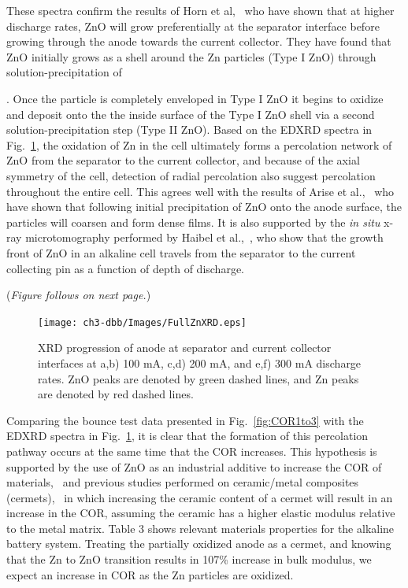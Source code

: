 {These spectra confirm the results of Horn et al,~\cite{horn} who have shown that at higher discharge rates, ZnO will grow preferentially at the separator interface before growing through the anode towards the current collector. They have found that ZnO initially grows as a shell around the Zn particles (Type I ZnO) through solution-precipitation of {. Once the particle is completely enveloped in Type I ZnO it begins to oxidize and deposit onto the the inside surface of the Type I ZnO shell via a second solution-precipitation step (Type II ZnO). Based on the EDXRD spectra in Fig.~\ref{fig:znxrd}, the oxidation of Zn in the cell ultimately forms a percolation network of ZnO from the separator to the current collector, and because of the axial symmetry of the cell, detection of radial percolation also suggest percolation throughout the entire cell. This agrees well with the results of Arise et al.,~\cite{arise} who have shown that following initial precipitation of ZnO onto the anode surface, the particles will coarsen and form dense films. It is also supported by the \textit{in situ} x-ray microtomography performed by Haibel et al.,~\cite{haibel}, who show that the growth front of ZnO in an alkaline cell travels from the separator to the current collecting pin as a function of depth of discharge.
\begin{minipage}{\textwidth}
\centering
(\textit{Figure follows on next page.})
\end{minipage}
\clearpage

\begin{figure}[htb]
\centering
    \texttt{[image: ch3-dbb/Images/FullZnXRD.eps]}
    \caption[XRD progression of anode at separator and current collector interfaces at 100 mA, 200 mA, and 300 mA discharge rates.]{XRD progression of anode at separator and current collector interfaces at a,b) 100 mA, c,d) 200 mA, and e,f) 300 mA discharge rates. ZnO peaks are denoted by green dashed lines, and Zn peaks are denoted by red dashed lines.}
    \label{fig:znxrd}
\end{figure}
\clearpage

Comparing the bounce test data presented in Fig.~\ref{fig:COR1to3} with the EDXRD spectra in Fig.~\ref{fig:znxrd}, it is clear that the formation of this percolation pathway occurs at the same time that the COR increases. This hypothesis is supported by the use of ZnO as an industrial additive to increase the COR of materials,~\cite{nesbitt_golf} and previous studies performed on ceramic/metal composites (cermets),~\cite{hussainova} in which increasing the ceramic content of a cermet will result in an increase in the COR, assuming the ceramic has a higher elastic modulus relative to the metal matrix. Table 3 shows relevant materials properties for the alkaline battery system. Treating the partially oxidized anode as a cermet, and knowing that the Zn to ZnO transition results in 107\% increase in bulk modulus, we expect an increase in COR as the Zn particles are oxidized.


}}
